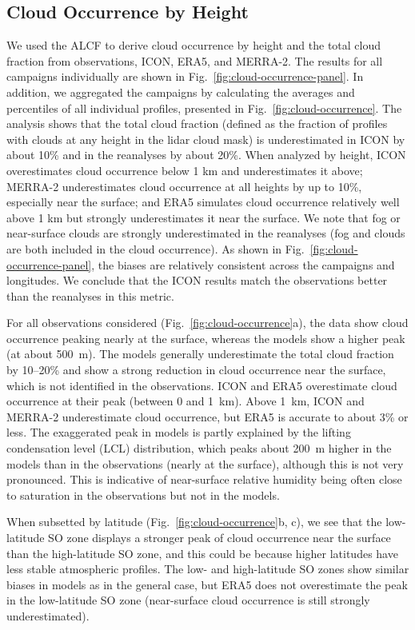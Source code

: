 \documentclass[draft]{agujournal2019}
\begin{document}
\subsection{Cloud Occurrence by Height}
\label{sec:cloud-occurrence}

We used the ALCF to derive cloud occurrence by height and the total cloud fraction from observations, ICON, ERA5, and MERRA-2. The results for all campaigns individually are shown in Fig.~\ref{fig:cloud-occurrence-panel}. In addition, we aggregated the campaigns by calculating the averages and percentiles of all individual profiles, presented in Fig.~\ref{fig:cloud-occurrence}. The analysis shows that the total cloud fraction (defined as the fraction of profiles with clouds at any height in the lidar cloud mask) is underestimated in ICON by about 10\% and in the reanalyses by about 20\%. When analyzed by height, ICON overestimates cloud occurrence below 1 km and underestimates it above; MERRA-2 underestimates cloud occurrence at all heights by up to 10\%, especially near the surface; and ERA5 simulates cloud occurrence relatively well above 1 km but strongly underestimates it near the surface. We note that fog or near-surface clouds are strongly underestimated in the reanalyses (fog and clouds are both included in the cloud occurrence). As shown in Fig.~\ref{fig:cloud-occurrence-panel}, the biases are relatively consistent across the campaigns and longitudes. We conclude that the ICON results match the observations better than the reanalyses in this metric.

For all observations considered (Fig.~\ref{fig:cloud-occurrence}a), the data show cloud occurrence peaking nearly at the surface, whereas the models show a higher peak (at about 500~m). The models generally underestimate the total cloud fraction by 10--20\% and show a strong reduction in cloud occurrence near the surface, which is not identified in the observations. ICON and ERA5 overestimate cloud occurrence at their peak (between 0 and 1~km). Above 1~km, ICON and MERRA-2 underestimate cloud occurrence, but ERA5 is accurate to about 3\% or less. The exaggerated peak in models is partly explained by the lifting condensation level (LCL) distribution, which peaks about 200~m higher in the models than in the observations (nearly at the surface), although this is not very pronounced. This is indicative of near-surface relative humidity being often close to saturation in the observations but not in the models.

When subsetted by latitude (Fig.~\ref{fig:cloud-occurrence}b, c), we see that the low-latitude SO zone displays a stronger peak of cloud occurrence near the surface than the high-latitude SO zone, and this could be because higher latitudes have less stable atmospheric profiles. The low- and high-latitude SO zones show similar biases in models as in the general case, but ERA5 does not overestimate the peak in the low-latitude SO zone (near-surface cloud occurrence is still strongly underestimated).
\end{document}

